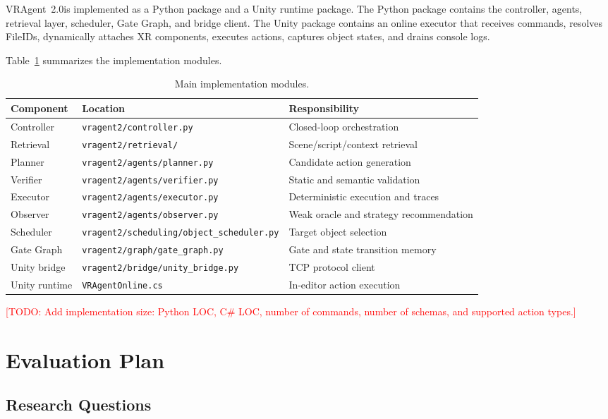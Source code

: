 \documentclass[10pt,conference]{IEEEtran}
\newcommand{\todo}[1]{\textcolor{red}{[TODO: #1]}}
\newcommand{\tool}{VRAgent~2.0}
\begin{document}
\tool is implemented as a Python package and a Unity runtime package. The Python
package contains the controller, agents, retrieval layer, scheduler, Gate Graph,
and bridge client. The Unity package contains an online executor that receives
commands, resolves FileIDs, dynamically attaches XR components, executes actions,
captures object states, and drains console logs.

Table~\ref{tab:modules} summarizes the implementation modules.

\begin{table}[t]
\centering
\caption{Main implementation modules.}
\label{tab:modules}
\begin{tabular}{lll}
\toprule
Component & Location & Responsibility \\
\midrule
Controller & \texttt{vragent2/controller.py} & Closed-loop orchestration \\
Retrieval & \texttt{vragent2/retrieval/} & Scene/script/context retrieval \\
Planner & \texttt{vragent2/agents/planner.py} & Candidate action generation \\
Verifier & \texttt{vragent2/agents/verifier.py} & Static and semantic validation \\
Executor & \texttt{vragent2/agents/executor.py} & Deterministic execution and traces \\
Observer & \texttt{vragent2/agents/observer.py} & Weak oracle and strategy recommendation \\
Scheduler & \texttt{vragent2/scheduling/object\_scheduler.py} & Target object selection \\
Gate Graph & \texttt{vragent2/graph/gate\_graph.py} & Gate and state transition memory \\
Unity bridge & \texttt{vragent2/bridge/unity\_bridge.py} & TCP protocol client \\
Unity runtime & \texttt{VRAgentOnline.cs} & In-editor action execution \\
\bottomrule
\end{tabular}
\end{table}

\todo{Add implementation size: Python LOC, C\# LOC, number of commands, number of
schemas, and supported action types.}

\section{Evaluation Plan}

\subsection{Research Questions}
\end{document}
